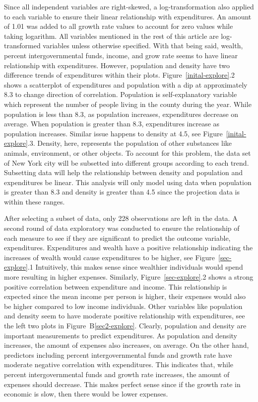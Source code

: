 \documentclass[11pt]{article}\usepackage[]{graphicx}\usepackage[]{color}
\begin{document}
\noindent Since all independent variables are right-skewed, a log-transformation also applied to each variable to ensure their linear relationship with expenditures. An amount of 1.01 was added to all growth rate values to account for zero values while taking logarithm. All variables mentioned in the rest of this article are log-transformed variables unless otherwise specified. With that being said, wealth, percent intergovernmental funds, income, and grow rate seems to have linear relationship with expenditures. However, population and density have two difference trends of expenditures within their plots. Figure~\ref{inital-explore}.2 shows a scatterplot of expenditures and population with a dip at approximately 8.3 to change direction of correlation. Population is self-explanatory variable which represent the number of people living in the county during the year. While population is less than 8.3, as population increases, expenditures decrease on average. When population is greater than 8.3, expenditures increase as population increases. Similar issue happens to density at 4.5, see Figure~\ref{inital-explore}.3. Density, here, represents the population of other substances like animals, environment, or other objects. To account for this problem, the data set of New York city will be subsetted into different groups according to each trend. Subsetting data will help the relationship between density and population and expenditures be linear. This analysis will only model using data when population is greater than 8.3 and density is greater than 4.5 since the projection data is within these ranges.    
\hfill \break



\noindent After selecting a subset of data, only 228 observations are left in the data. A second round of data exploratory was conducted to ensure the relationship of each measure to see if they are significant to predict the outcome variable, expenditures. Expenditures and wealth have a positive relationship indicating the increases of wealth would cause expenditures to be higher, see Figure~\ref{sec-explore}.1 Intuitively, this makes sense since wealthier individuals would spend more resulting in higher expenses. Similarly, Figure~\ref{sec-explore}.2 shows a strong positive correlation between expenditure and income. This relationship is expected since the mean income per person is higher, their expenses would also be higher compared to low income individuals. Other variables like population and density seem to have moderate positive relationship with expenditures, see the left two plots in Figure~B\ref{sec2-explore}. Clearly, population and density are important measurements to predict expenditures. As population and density increases, the amount of expenses also increases, on average. On the other hand, predictors including percent intergovernmental funds and growth rate have moderate negative correlation with expenditures. This indicates that, while percent intergovernmental funds and growth rate increases, the amount of expenses should decrease. This makes perfect sense since if the growth rate in economic is slow, then there would be lower expenses.             
\end{document}
